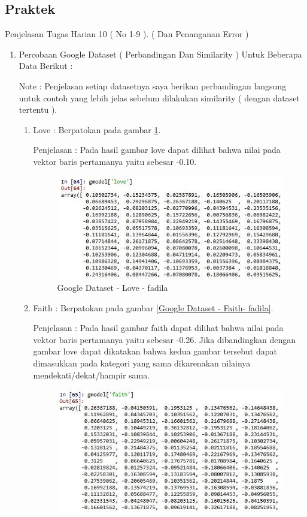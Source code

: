 \begin{enumerate}
\subsection{Praktek}
Penjelasan Tugas Harian 10 ( No 1-9 ). ( Dan Penanganan Error )
\begin{enumerate}
\item Percobaan Google Dataset ( Perbandingan Dan Similarity ) Untuk Beberapa Data Berikut :
\par Note : Penjelasan setiap datasetnya saya berikan perbandingan langsung untuk contoh yang lebih jelas sebelum dilakukan similarity ( dengan dataset tertentu ).
\begin{enumerate}
\item Love : Berpatokan pada gambar \ref{Google Dataset - Love - fadila}.
\par Penjelasan : Pada hasil gambar love dapat dilihat bahwa nilai pada vektor baris pertamanya yaitu sebesar -0.10.
\par
\begin{figure}[!hbtp]
\centering
\includegraphics[scale=0.3]{figures/1-love-fadila.jpg}
\caption{Google Dataset - Love - fadila}
\label{Google Dataset - Love - fadila}
\end{figure}
\par
\item Faith :  Berpatokan pada gambar \ref{Google Dataset - Faith- fadila}.
\par Penjelasan : Pada hasil gambar faith dapat dilihat bahwa nilai pada vektor baris pertamanya yaitu sebesar -0.26. Jika dibandingkan dengan gambar love dapat dikatakan bahwa kedua gambar tersebut dapat dimasukkan pada kategori yang sama dikarenakan nilainya mendekati/dekat/hampir sama.
\par
\begin{figure}[!hbtp]
\centering
\includegraphics[scale=0.3]{figures/1-faith-fadila.jpg}

\end{figure}
\end{enumerate}
\end{enumerate}
\end{enumerate}
